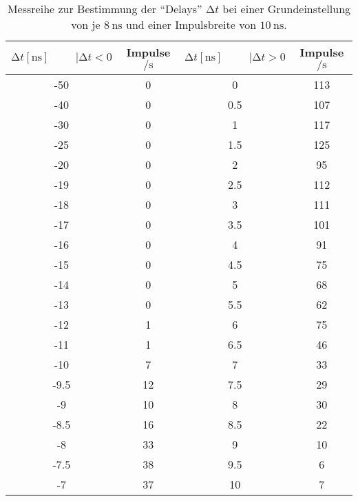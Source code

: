 \begin{table}
    \centering
    \caption{Messreihe zur Bestimmung der \enquote{Delays} $\increment t$ bei einer Grundeinstellung von je $\SI{8}{\nano\second}$ und einer Impulsbreite von $\SI{10}{\nano\second}$. } 
    \label{tab:MessreiheDelay20ns}
    \begin{tabular}{c c || c c}
        \toprule
        $\increment t [\si{\nano\second}] \hspace{1cm}|\increment t < 0 $ & Impulse $\si{\per\second} $ & $\increment t [\si{\nano\second}] \hspace{1cm}|\increment t > 0 $ & Impulse $\si{\per\second}$ \\
        \midrule
        -50    &   0      &    0       &   113    \\
        -40    &   0      &    0.5     &   107    \\
        -30    &   0      &    1       &   117    \\
        -25    &   0      &    1.5     &   125    \\
        -20    &   0      &    2       &   95    \\
        -19    &   0      &    2.5     &   112    \\
        -18    &   0      &    3       &   111    \\
        -17    &   0      &    3.5     &   101    \\
        -16    &   0      &    4       &   91    \\
        -15    &   0      &    4.5     &   75    \\
        -14    &   0      &    5       &   68    \\
        -13    &   0      &    5.5     &   62    \\
        -12    &   1      &    6       &   75    \\
        -11    &   1      &    6.5     &   46    \\
        -10    &   7      &    7       &   33    \\
        -9.5   &   12     &    7.5     &   29    \\
        -9     &   10     &    8       &   30    \\
        -8.5   &   16     &    8.5     &   22    \\
        -8     &   33     &    9       &   10    \\
        -7.5   &   38     &    9.5     &   6    \\
        -7     &   37     &    10      &   7    \\

\end{tabular}
\end{table}
